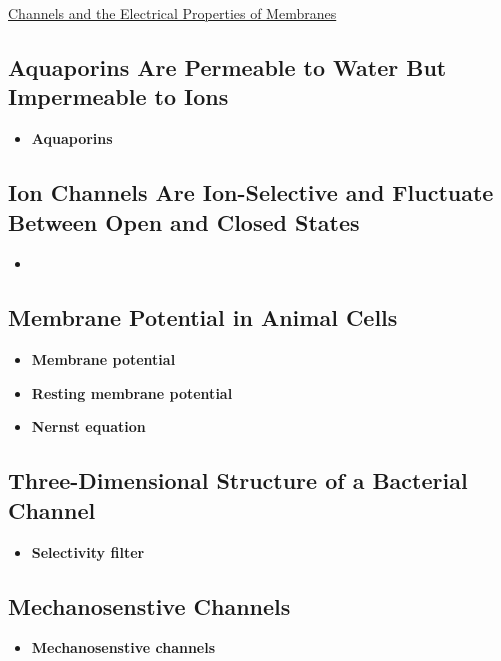 \documentclass[12pt,letterpaper]{article}
\begin{document}
\hypertarget{11.3}{}
\begin{secbox}{\hyperlink{11}{Channels and the Electrical Properties of Membranes}}{
    \hypertarget{11.3.1}{\subsection*{Aquaporins Are Permeable to Water But Impermeable to Ions}}
    \begin{itemize}
        \item \textbf{Aquaporins}
    \end{itemize}

    \hypertarget{11.3.2}{\subsection*{Ion Channels Are Ion-Selective and Fluctuate Between Open and Closed States}}
    \begin{itemize}
        \item
    \end{itemize}

    \hypertarget{11.3.3}{\subsection*{Membrane Potential in Animal Cells}}
    \begin{itemize}
        \item \textbf{Membrane potential }
        \item \textbf{Resting membrane potential}
        \item \textbf{Nernst equation}
    \end{itemize}

    \hypertarget{11.3.4}{\subsection*{Three-Dimensional Structure of a Bacterial  Channel}}
    \begin{itemize}
        \item \textbf{Selectivity filter}
    \end{itemize}

    \hypertarget{11.3.5}{\subsection*{Mechanosenstive Channels}}
    \begin{itemize}
        \item \textbf{Mechanosenstive channels}
    \end{itemize}

}
\end{secbox}
\end{document}
